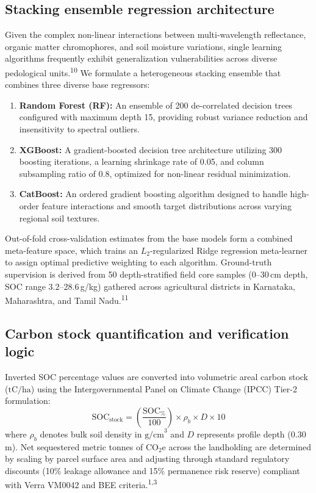 \documentclass[a4paper,10pt]{article}
\begin{document}
\subsection{Stacking ensemble regression architecture}
Given the complex non-linear interactions between multi-wavelength reflectance, organic matter chromophores, and soil moisture variations, single learning algorithms frequently exhibit generalization vulnerabilities across diverse pedological units.\textsuperscript{10} We formulate a heterogeneous stacking ensemble that combines three diverse base regressors:
\begin{enumerate}[noitemsep,topsep=2pt]
  \item \textbf{Random Forest (RF):} An ensemble of 200 de-correlated decision trees configured with maximum depth 15, providing robust variance reduction and insensitivity to spectral outliers.
  \item \textbf{XGBoost:} A gradient-boosted decision tree architecture utilizing 300 boosting iterations, a learning shrinkage rate of 0.05, and column subsampling ratio of 0.8, optimized for non-linear residual minimization.
  \item \textbf{CatBoost:} An ordered gradient boosting algorithm designed to handle high-order feature interactions and smooth target distributions across varying regional soil textures.
\end{enumerate}
Out-of-fold cross-validation estimates from the base models form a combined meta-feature space, which trains an $L_2$-regularized Ridge regression meta-learner to assign optimal predictive weighting to each algorithm. Ground-truth supervision is derived from 50 depth-stratified field core samples (0--30\,cm depth, SOC range 3.2--28.6\,g/kg) gathered across agricultural districts in Karnataka, Maharashtra, and Tamil Nadu.\textsuperscript{11}

\subsection{Carbon stock quantification and verification logic}
Inverted SOC percentage values are converted into volumetric areal carbon stock ($\text{tC/ha}$) using the Intergovernmental Panel on Climate Change (IPCC) Tier-2 formulation:
\begin{equation}
  \text{SOC}_{\text{stock}} = \left(\frac{\text{SOC}_{\%}}{100}\right) \times \rho_b \times D \times 10
  \label{eq:soc_stock}
\end{equation}
where $\rho_b$ denotes bulk soil density in $\text{g/cm}^3$ and $D$ represents profile depth ($0.30\,$m). Net sequestered metric tonnes of $\text{CO}_2\text{e}$ across the landholding are determined by scaling by parcel surface area and adjusting through standard regulatory discounts (10\% leakage allowance and 15\% permanence risk reserve) compliant with Verra VM0042 and BEE criteria.\textsuperscript{1,3}
\end{document}
